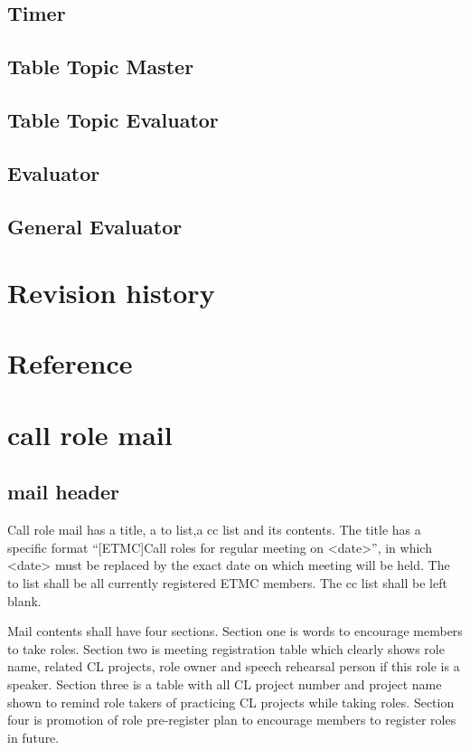 \subsection{Timer}
\subsection{Table Topic Master}
\subsection{Table Topic Evaluator}
\subsection{Evaluator}
\subsection{General Evaluator}

\section{Revision history}
\section{Reference}

\section{call role mail}
\subsection{mail header}
Call role mail has a title, a to list,a cc list and its contents. The title has a specific 
format ``[ETMC]Call roles for regular meeting on <date>'', in which <date> must be replaced
by the exact date on which meeting will be held. The to list shall be all currently registered 
ETMC members. The cc list shall be left blank.

Mail contents shall have four sections. Section one is words to encourage members to 
take roles. Section two is meeting registration table which clearly shows role name, related 
CL projects, role owner and speech rehearsal person if this role is a speaker. Section three 
is a table with all CL project number and project name shown to remind role takers of practicing
CL projects while taking roles. Section four is promotion of role pre-register plan to encourage
members to register roles in future.



\bye

